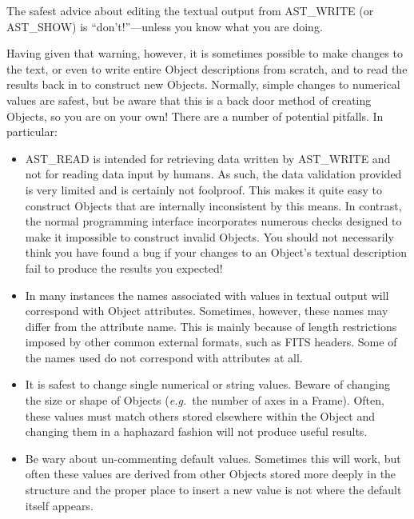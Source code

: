 \documentclass[twoside,11pt]{article}
\newcommand{\htmlref}[2]{#1}
\begin{document}
The safest advice about editing the textual output from \htmlref{AST\_WRITE}{AST_WRITE} (or
\htmlref{AST\_SHOW}{AST_SHOW}) is ``don't!''---unless you know what you are doing.

Having given that warning, however, it is sometimes possible to make
changes to the text, or even to write entire \htmlref{Object}{Object} descriptions from
scratch, and to read the results back in to construct new
Objects. Normally, simple changes to numerical values are safest, but
be aware that this is a back door method of creating Objects, so
you are on your own! There are a number of potential pitfalls. In
particular:

\begin{itemize}
\item \htmlref{AST\_READ}{AST_READ} is intended for retrieving data written by AST\_WRITE
and not for reading data input by humans. As such, the data validation
provided is very limited and is certainly not foolproof. This makes it
quite easy to construct Objects that are internally inconsistent by
this means. In contrast, the normal programming interface incorporates
numerous checks designed to make it impossible to construct invalid
Objects. You should not necessarily think you have found a bug if your
changes to an Object's textual description fail to produce the results
you expected!

\item In many instances the names associated with values in textual
output will correspond with Object attributes. Sometimes, however,
these names may differ from the attribute name. This is mainly because
of length restrictions imposed by other common external formats, such
as FITS headers. Some of the names used do not correspond with
attributes at all.

\item It is safest to change single numerical or string values.
Beware of changing the size or shape of Objects ({\em{e.g.}}\ the
number of axes in a \htmlref{Frame}{Frame}). Often, these values must match others
stored elsewhere within the Object and changing them in a haphazard
fashion will not produce useful results.

\item Be wary about un-commenting default values. Sometimes this will
work, but often these values are derived from other Objects stored
more deeply in the structure and the proper place to insert a new
value is not where the default itself appears.
\end{itemize}
\end{document}
